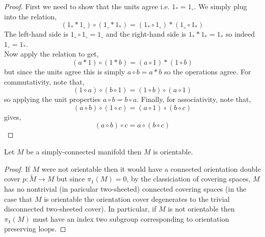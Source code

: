 \documentclass[12pt]{extarticle}
\begin{document}
\begin{proof}
First we need to show that the units agree i.e. $1_* = 1_\circ$. We simply plug into the relation,
\[ (1_* * 1_\circ) \circ (1_\circ * 1_*) = (1_* \circ 1_\circ) * (1_\circ \circ 1_*) \]
The left-hand side is $1_\circ \circ 1_\circ = 1_\circ$ and the right-hand side is $1_* * 1_* = 1_*$ so indeed $1_\circ = 1_*$. 
\bigskip\\
Now apply the relation to get,
\[ (a * 1) \circ (1 * b) = (a \circ 1) * (1 \circ b) \]
but since the units agree this is simply $a \circ b = a * b$ so the operations agree. For commutativity, note that,
\[ (1 \circ a) \circ (b \circ 1) = (1 \circ b) \circ (a \circ 1) \]
so applying the unit properties $a \circ b = b \circ a$. Finally, for associativity, note that,
\[ (a \circ b) \circ (1 \circ c) = (a \circ 1) \circ (b \circ c) \]
gives,
\[ (a \circ b) \circ c = a \circ (b \circ c) \]
\end{proof}


\label{orientable_if_simply_connected}
\begin{lemma}
Let $M$ be a simply-connected manifold then $M$ is orientable.
\end{lemma}

\begin{proof}
If $M$ were not orientable then it would have a connected orientation double cover $p : \tilde{M} \to M$ but since $\pi_1(M) = 0$, by the classiciation of covering spaces, $M$ has no nontrivial (in paricular two-sheeted) connected covering spaces (in the case that $M$ is orientable the orientation cover degenerates to the trivial disconnected two-sheeted cover). In particular, if $M$ is not orientable then $\pi_1(M)$ must have an index two subgroup corresponding to orientation preserving loops. 
\end{proof}
\end{document}
